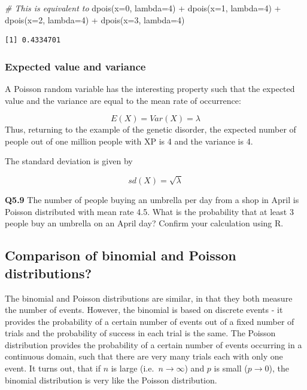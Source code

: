 \documentclass[
  oneside]{krantz}
\newenvironment{Shaded}{\begin{snugshade}}{\end{snugshade}}
\newcommand{\AttributeTok}[1]{\textcolor[rgb]{0.77,0.63,0.00}{#1}}
\newcommand{\CommentTok}[1]{\textcolor[rgb]{0.56,0.35,0.01}{\textit{#1}}}
\newcommand{\DecValTok}[1]{\textcolor[rgb]{0.00,0.00,0.81}{#1}}
\newcommand{\FunctionTok}[1]{\textcolor[rgb]{0.00,0.00,0.00}{#1}}
\newcommand{\NormalTok}[1]{#1}
\newcommand{\SpecialCharTok}[1]{\textcolor[rgb]{0.00,0.00,0.00}{#1}}
\begin{document}
\begin{Shaded}
\begin{Highlighting}[]
\CommentTok{\# This is equivalent to}
\FunctionTok{dpois}\NormalTok{(}\AttributeTok{x=}\DecValTok{0}\NormalTok{, }\AttributeTok{lambda=}\DecValTok{4}\NormalTok{) }\SpecialCharTok{+} \FunctionTok{dpois}\NormalTok{(}\AttributeTok{x=}\DecValTok{1}\NormalTok{, }\AttributeTok{lambda=}\DecValTok{4}\NormalTok{) }\SpecialCharTok{+} 
  \FunctionTok{dpois}\NormalTok{(}\AttributeTok{x=}\DecValTok{2}\NormalTok{, }\AttributeTok{lambda=}\DecValTok{4}\NormalTok{) }\SpecialCharTok{+} \FunctionTok{dpois}\NormalTok{(}\AttributeTok{x=}\DecValTok{3}\NormalTok{, }\AttributeTok{lambda=}\DecValTok{4}\NormalTok{) }
\end{Highlighting}
\end{Shaded}

\begin{verbatim}
[1] 0.4334701
\end{verbatim}

\hypertarget{expected-value-and-variance}{%
\subsubsection{Expected value and variance}\label{expected-value-and-variance}}

A Poisson random variable has the interesting property such that the expected value and the variance are equal to the mean rate of occurrence:

\[E(X) = Var(X) = \lambda\]
Thus, returning to the example of the genetic disorder, the expected number of people out of one million people with XP is 4 and the variance is 4.

The standard deviation is given by

\[sd(X) = \sqrt{\lambda}\]

\textbf{Q5.9} The number of people buying an umbrella per day from a shop in April is Poisson
distributed with mean rate 4.5. What is the probability that at least 3 people buy an umbrella on an April day? Confirm your calculation using R.

\hypertarget{comparison-of-binomial-and-poisson-distributions}{%
\subsection{Comparison of binomial and Poisson distributions?}\label{comparison-of-binomial-and-poisson-distributions}}

The binomial and Poisson distributions are similar, in that they both measure the number of events. However, the binomial is based on discrete events - it provides the probability of a certain number of events out of a fixed number of trials and the probability of success in each trial is the same. The Poisson distribution provides the probability of a certain number of events occurring in a continuous domain, such that there are very many trials each with only one event. It turns out, that if \(n\) is large (i.e.~\(n \rightarrow \infty\)) and \(p\) is small (\(p \rightarrow 0\)), the binomial distribution is very like the Poisson distribution.
\end{document}
